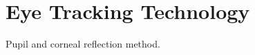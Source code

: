 \section{Eye Tracking Technology} \label{sec:hwds_EyeTrackingTechnology}

Pupil and corneal reflection method.